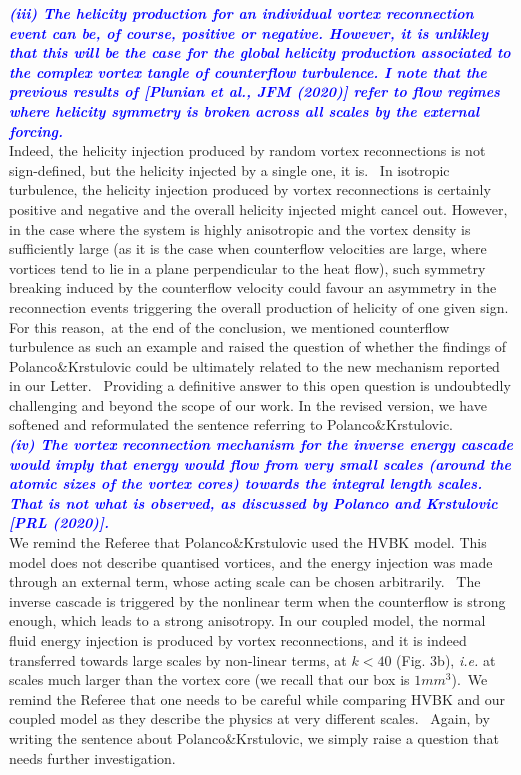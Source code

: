 \documentclass[a4paper,10pt]{article}
\def\blue#1{\textcolor{blue}{#1}}
\def\refcomment#1{\textbf{\blue{\emph{#1}}}\\}
\begin{document}
\refcomment{(iii) The helicity production for an individual vortex reconnection event can be, of course, positive or negative. However, it is unlikley that this will be the case for the global helicity production associated to the complex vortex tangle of counterflow turbulence. I note that the previous results of [Plunian et al., JFM (2020)] refer to flow regimes where helicity symmetry is broken across all scales by the external forcing.}

Indeed, the helicity injection produced by random vortex reconnections is not sign-defined, but the helicity injected by a single one, it is.  In isotropic turbulence, the helicity injection produced by vortex reconnections is certainly positive and negative and the overall helicity injected
might cancel out. However, in the case where the system is highly anisotropic and the vortex density is sufficiently large (as it is the case when counterflow velocities are large, where vortices tend to lie in a plane perpendicular to the heat flow), such symmetry breaking induced by the counterflow velocity could favour an asymmetry in the reconnection events triggering the overall production of helicity of one given sign. For this reason, at the end of the conclusion, we mentioned counterflow turbulence as such an example and raised the question of whether the findings of Polanco\&Krstulovic could be ultimately related to the new mechanism reported in our Letter.  Providing a definitive answer to this open question is undoubtedly challenging and beyond the scope of our work. In the revised version, we have softened and reformulated the sentence referring to Polanco\&Krstulovic.\\

\refcomment{(iv) The vortex reconnection mechanism for the inverse energy cascade would imply that energy would flow from very small scales (around the atomic sizes of the vortex cores) towards the integral length scales. That is not what is observed, as discussed by Polanco and Krstulovic [PRL (2020)].}

We remind the Referee that Polanco\&Krstulovic used the HVBK model. This model does not describe quantised vortices, and the energy injection was made through an external term, whose acting scale can be chosen arbitrarily.  The inverse cascade is triggered by the nonlinear term when the counterflow is strong enough, which leads to a strong anisotropy. In our coupled model, the normal fluid energy injection is produced by vortex reconnections, and it is indeed transferred towards large scales by non-linear terms, at $k < 40$ (Fig. 3b), \textit{i.e.} at scales much larger than the vortex core (we recall that our box is
$1mm^3$). We remind the Referee that one needs to be careful while comparing HVBK and our coupled model as they describe the physics at very different scales.  Again, by writing the sentence about Polanco\&Krstulovic, we simply raise a question that needs further investigation.\\
\end{document}
